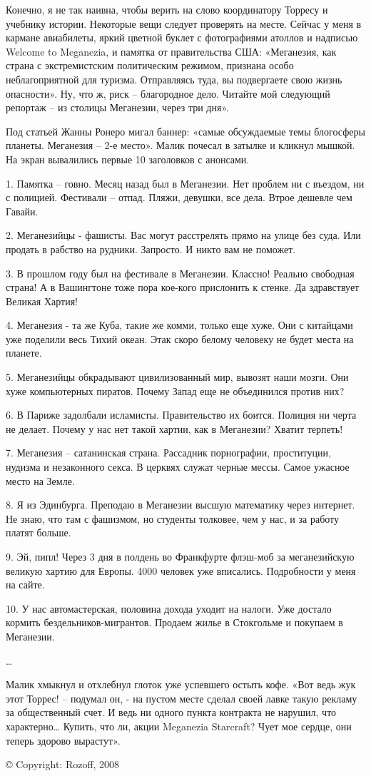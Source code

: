 Конечно, я не так наивна, чтобы верить на слово координатору Торресу и учебнику истории. Некоторые вещи следует проверять на месте. Сейчас у меня в кармане авиабилеты, яркий цветной буклет с фотографиями атоллов и надписью Welcome to Meganezia, и памятка от правительства США: «Меганезия, как страна с экстремистским политическим режимом, признана особо неблагоприятной для туризма. Отправляясь туда, вы подвергаете свою жизнь опасности». Ну, что ж, риск – благородное дело. Читайте мой следующий репортаж – из столицы Меганезии, через три дня».

Под статьей Жанны Ронеро мигал баннер: «самые обсуждаемые темы блогосферы планеты. Меганезия – 2-е место». Малик почесал в затылке и кликнул мышкой. На экран вывалились первые 10 заголовков с анонсами.

1. Памятка – говно. Месяц назад был в Меганезии. Нет проблем ни с въездом, ни с полицией. Фестивали – отпад. Пляжи, девушки, все дела. Втрое дешевле чем Гавайи.

2. Меганезийцы - фашисты. Вас могут расстрелять прямо на улице без суда. Или продать в рабство на рудники. Запросто. И никто вам не поможет.

3. В прошлом году был на фестивале в Меганезии. Классно! Реально свободная страна! А в Вашингтоне тоже пора кое-кого прислонить к стенке. Да здравствует Великая Хартия!

4. Меганезия - та же Куба, такие же комми, только еще хуже. Они с китайцами уже поделили весь Тихий океан. Этак скоро белому человеку не будет места на планете.

5. Меганезийцы обкрадывают цивилизованный мир, вывозят наши мозги. Они хуже компьютерных пиратов. Почему Запад еще не объединился против них?

6. В Париже задолбали исламисты. Правительство их боится. Полиция ни черта не делает. Почему у нас нет такой хартии, как в Меганезии? Хватит терпеть!

7. Меганезия – сатанинская страна. Рассадник порнографии, проституции, нудизма и незаконного секса. В церквях служат черные мессы. Самое ужасное место на Земле.

8. Я из Эдинбурга. Преподаю в Меганезии высшую математику через интернет. Не знаю, что там с фашизмом, но студенты толковее, чем у нас, и за работу платят больше.

9. Эй, пипл! Через 3 дня в полдень во Франкфурте флэш-моб за меганезийскую великую хартию для Европы. 4000 человек уже вписались. Подробности у меня на сайте.

10. У нас автомастерская, половина дохода уходит на налоги. Уже достало кормить бездельников-мигрантов. Продаем жилье в Стокгольме и покупаем в Меганезии.

…

Малик хмыкнул и отхлебнул глоток уже успевшего остыть кофе. «Вот ведь жук этот Торрес! – подумал он, - на пустом месте сделал своей лавке такую рекламу за общественный счет. И ведь ни одного пункта контракта не нарушил, что характерно… Купить, что ли, акции Meganezia Starcraft? Чует мое сердце, они теперь здорово вырастут».


© Copyright: Rozoff, 2008

